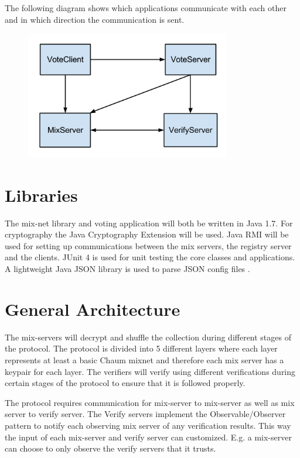 \documentclass[a4paper,11pt]{kth-mag}
\begin{document}
The following diagram shows which applications communicate with each other and in which direction the communication is sent.
\begin{figure}
\centering
\includegraphics[width=0.8\textwidth]{Comm_diagram.png}
\end{figure}

\section{Libraries}
The mix-net library and voting application will both be written in Java 1.7. For cryptography the Java Cryptography Extension\cite{6}  will be used. Java RMI\cite{7} will be used for setting up communications between the mix servers, the registry server and the clients. JUnit 4\cite{8} is used for unit testing the core classes and applications. A lightweight Java JSON library\cite{9} is used to parse JSON config files .

\section{General Architecture}
The mix-servers will decrypt and shuffle the collection during different stages of the protocol. The protocol is divided into 5 different layers where each layer represents at least a basic Chaum mixnet and therefore each mix server has a keypair for each layer. The verifiers will verify using different verifications during certain stages of the protocol to ensure that it is followed properly.

The protocol requires communication for mix-server to mix-server as well as mix server to verify server. The Verify servers implement the Observable/Observer pattern to notify each observing mix server of any verification results. This way the input of each mix-server and verify server can customized. E.g. a mix-server can choose to only observe the verify servers that it trusts.
\end{document}
